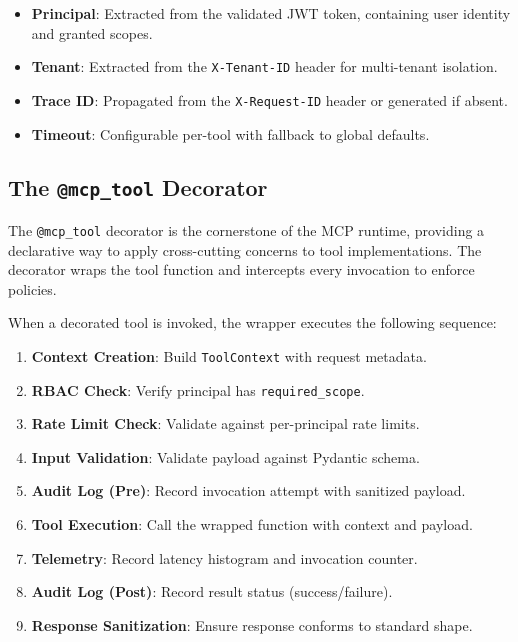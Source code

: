 \documentclass[a4paper,twoside]{sapthesis}
\begin{document}
\begin{itemize}
    \item \textbf{Principal}: Extracted from the validated JWT token, containing user identity and granted scopes.
    \item \textbf{Tenant}: Extracted from the \texttt{X-Tenant-ID} header for multi-tenant isolation.
    \item \textbf{Trace ID}: Propagated from the \texttt{X-Request-ID} header or generated if absent.
    \item \textbf{Timeout}: Configurable per-tool with fallback to global defaults.
\end{itemize}

\subsection{The \texttt{@mcp\_tool} Decorator}
\label{subsec:mcp-tool-decorator}

The \texttt{@mcp\_tool} decorator is the cornerstone of the MCP runtime, providing a declarative way to apply cross-cutting concerns to tool implementations. The decorator wraps the tool function and intercepts every invocation to enforce policies.

When a decorated tool is invoked, the wrapper executes the following sequence:

\begin{enumerate}
    \item \textbf{Context Creation}: Build \texttt{ToolContext} with request metadata.
    \item \textbf{RBAC Check}: Verify principal has \texttt{required\_scope}.
    \item \textbf{Rate Limit Check}: Validate against per-principal rate limits.
    \item \textbf{Input Validation}: Validate payload against Pydantic schema.
    \item \textbf{Audit Log (Pre)}: Record invocation attempt with sanitized payload.
    \item \textbf{Tool Execution}: Call the wrapped function with context and payload.
    \item \textbf{Telemetry}: Record latency histogram and invocation counter.
    \item \textbf{Audit Log (Post)}: Record result status (success/failure).
    \item \textbf{Response Sanitization}: Ensure response conforms to standard shape.
\end{enumerate}
\end{document}
